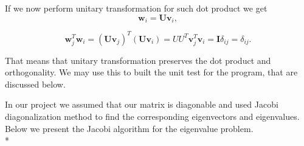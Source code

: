 \documentclass[10pt]{article}
\begin{document}
If we now perform unitary transformation for such dot product we get
\begin{equation}
\mathbf{w}_i=\mathbf{U}\mathbf{v}_i,
\end{equation}


\begin{equation}
\mathbf{w}_j^T\mathbf{w}_i=(\mathbf{U}\mathbf{v}_j)^T(\mathbf{U}\mathbf{v}_i)=UU^T\mathbf{v}_j^T\mathbf{v}_i=\mathbf{I}\delta_{ij}=\delta_{ij}.
\end{equation}


That means that unitary transformation preserves the dot product and orthogonality. We may use this to built the unit test for the program, that are discussed below.


In our project we assumed that our matrix is diagonable and used Jacobi diagonalization method to find the corresponding eigenvectors and eigenvalues. Below we present the Jacobi algorithm for the eigenvalue problem. 
\\*
\end{document}
